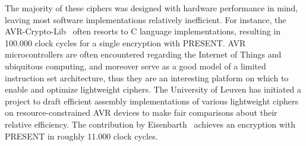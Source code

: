 \documentclass[11pt]{llncs2e} %
\begin{document}
The majority of these ciphers was designed with hardware performance in mind, leaving most software implementations relatively inefficient. For instance, the AVR-Crypto-Lib~\cite{avr_crypto_lib} often resorts to C language implementations, resulting in 100.000 clock cycles for a single encryption with PRESENT.
AVR microcontrollers are often encountered regarding the Internet of Things and ubiquitous computing, and moreover serve as a good model of a limited instruction set architecture, thus they are an interesting platform on which to enable and optimize lightweight ciphers.
The University of Leuven has initiated a project to draft efficient assembly implementations of various lightweight ciphers on resource-constrained AVR devices to make fair comparisons about their relative efficiency. The contribution by Eisenbarth~\cite{eisenbarth2012compact} achieves an encryption with PRESENT in roughly 11.000 clock cycles.
\end{document}
